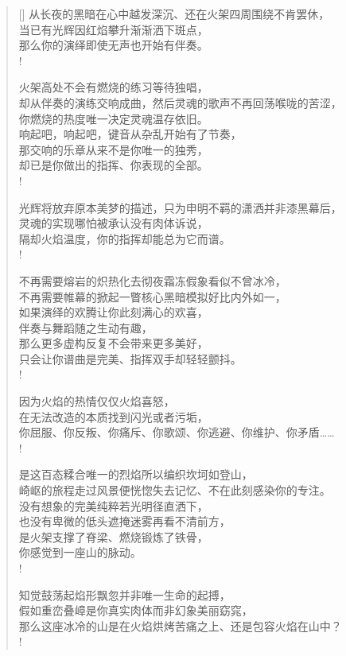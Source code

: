 \documentclass[UTF8, 12pt, a4paper]{ctexrep} %
\begin{document}
\begin{verse}[\versewidth]
从长夜的黑暗在心中越发深沉、还在火架四周围绕不肯罢休，\\
当已有光辉因红焰攀升渐渐洒下斑点，\\
那么你的演绎即使无声也开始有伴奏。\\!

火架高处不会有燃烧的练习等待独唱，\\
却从伴奏的演练交响成曲，然后灵魂的歌声不再回荡喉咙的苦涩，\\
你燃烧的热度唯一决定灵魂温存依旧。\\
响起吧，响起吧，键音从杂乱开始有了节奏，\\
那交响的乐章从来不是你唯一的独秀，\\
却已是你做出的指挥、你表现的全部。\\!

光辉将放弃原本美梦的描述，只为申明不羁的潇洒并非漆黑幕后，\\
灵魂的实现哪怕被承认没有肉体诉说，\\
隔却火焰温度，你的指挥却能总为它而谱。\\!

不再需要熔岩的炽热化去彻夜霜冻假象看似不曾冰冷，\\
不再需要帷幕的掀起一瞥核心黑暗模拟好比内外如一，\\
如果演绎的欢腾让你此刻满心的欢喜，\\
伴奏与舞蹈随之生动有趣，\\
那么更多虚构反复不会带来更多美好，\\
只会让你谱曲是完美、指挥双手却轻轻颤抖。\\!

因为火焰的热情仅仅火焰喜怒，\\
在无法改造的本质找到闪光或者污垢，\\
你屈服、你反叛、你痛斥、你歌颂、你逃避、你维护、你矛盾……\\!

是这百态糅合唯一的烈焰所以编织坎坷如登山，\\
崎岖的旅程走过风景便恍惚失去记忆、不在此刻感染你的专注。\\
没有想象的完美纯粹若光明径直洒下，\\
也没有卑微的低头遮掩迷雾再看不清前方，\\
是火架支撑了脊梁、燃烧锻炼了铁骨，\\
你感觉到一座山的脉动。\\!

知觉鼓荡起焰形飘忽并非唯一生命的起搏，\\
假如重峦叠嶂是你真实肉体而非幻象美丽窈窕，\\
那么这座冰冷的山是在火焰烘烤苦痛之上、还是包容火焰在山中？\\!


\end{verse}
\end{document}
